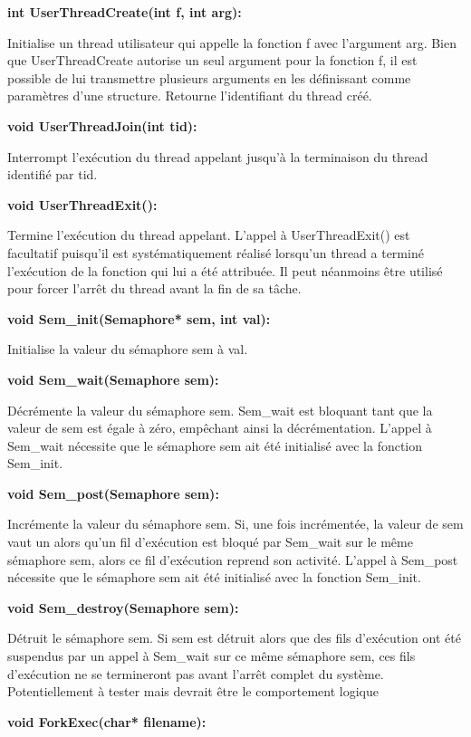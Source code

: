 \documentclass[12pt]{report}
\begin{document}
\textbf{int UserThreadCreate(int f, int arg):}

Initialise un thread utilisateur qui appelle la fonction f avec l'argument arg. Bien que UserThreadCreate autorise un seul argument pour la fonction f, il est possible de lui transmettre plusieurs arguments en les définissant comme paramètres d'une structure.
Retourne l’identifiant du thread créé.
\bigskip

\textbf{void UserThreadJoin(int tid):}

Interrompt l'exécution du thread appelant jusqu'à la terminaison du thread identifié par tid.
\bigskip


\textbf{void UserThreadExit():}

Termine l'exécution du thread appelant. L'appel à UserThreadExit() est facultatif puisqu'il est systématiquement réalisé lorsqu'un thread a terminé l'exécution de la fonction qui lui a été attribuée. Il peut néanmoins être utilisé pour forcer l'arrêt du thread avant la fin de sa tâche.
\bigskip


\textbf{void Sem\_init(Semaphore* sem, int val):}

Initialise la valeur du sémaphore sem à val.
\bigskip	


\textbf{void Sem\_wait(Semaphore sem):}

Décrémente la valeur du sémaphore sem. Sem\_wait est bloquant tant que la valeur de sem est égale à zéro, empêchant ainsi la décrémentation.
L'appel à Sem\_wait nécessite que le sémaphore sem ait été initialisé avec la fonction Sem\_init.
\bigskip


\textbf{void Sem\_post(Semaphore sem):}

Incrémente la valeur du sémaphore sem. Si, une fois incrémentée, la valeur de sem vaut un alors qu'un fil d'exécution est bloqué par Sem\_wait sur le même sémaphore sem, alors ce fil d'exécution reprend son activité.
L'appel à Sem\_post nécessite que le sémaphore sem ait été initialisé avec la fonction Sem\_init.
\bigskip


\textbf{void Sem\_destroy(Semaphore sem):}

Détruit le sémaphore sem. Si sem est détruit alors que des fils d'exécution ont été suspendus par un appel à Sem\_wait sur ce même sémaphore sem, ces fils d'exécution ne se termineront pas avant l'arrêt complet du système.\\
\color{red}Potentiellement à tester mais devrait être le comportement logique\color{black}
\bigskip


\textbf{void ForkExec(char* filename):}
\end{document}
